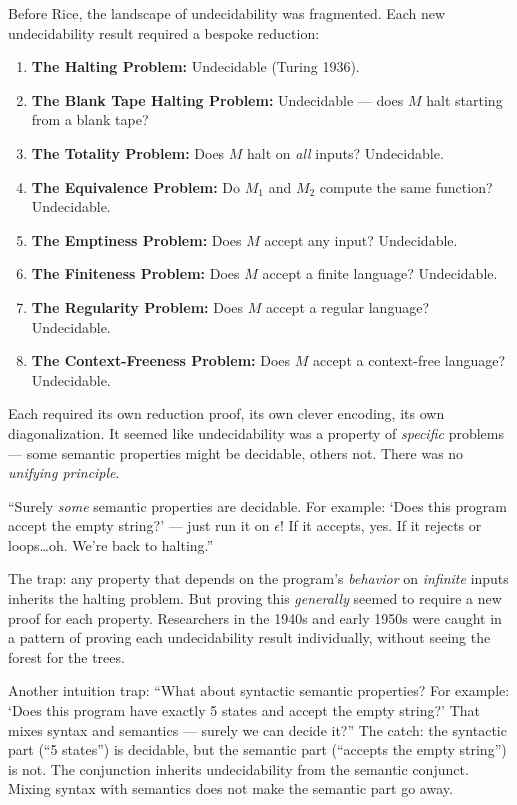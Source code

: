 Before Rice, the landscape of undecidability was fragmented. Each new undecidability result required a bespoke reduction:

\begin{enumerate}
\item \textbf{The Halting Problem:} Undecidable (Turing 1936).
\item \textbf{The Blank Tape Halting Problem:} Undecidable --- does $M$ halt starting from a blank tape?
\item \textbf{The Totality Problem:} Does $M$ halt on \emph{all} inputs? Undecidable.
\item \textbf{The Equivalence Problem:} Do $M_1$ and $M_2$ compute the same function? Undecidable.
\item \textbf{The Emptiness Problem:} Does $M$ accept any input? Undecidable.
\item \textbf{The Finiteness Problem:} Does $M$ accept a finite language? Undecidable.
\item \textbf{The Regularity Problem:} Does $M$ accept a regular language? Undecidable.
\item \textbf{The Context-Freeness Problem:} Does $M$ accept a context-free language? Undecidable.
\end{enumerate}

Each required its own reduction proof, its own clever encoding, its own diagonalization. It seemed like undecidability was a property of \emph{specific} problems --- some semantic properties might be decidable, others not. There was no \emph{unifying principle}.

``Surely \emph{some} semantic properties are decidable. For example: `Does this program accept the empty string?' --- just run it on $\epsilon$! If it accepts, yes. If it rejects or loops\ldots oh. We're back to halting.''

The trap: any property that depends on the program's \emph{behavior} on \emph{infinite} inputs inherits the halting problem. But proving this \emph{generally} seemed to require a new proof for each property. Researchers in the 1940s and early 1950s were caught in a pattern of proving each undecidability result individually, without seeing the forest for the trees.

Another intuition trap: ``What about syntactic semantic properties? For example: `Does this program have exactly 5 states and accept the empty string?' That mixes syntax and semantics --- surely we can decide it?'' The catch: the syntactic part (``5 states'') is decidable, but the semantic part (``accepts the empty string'') is not. The conjunction inherits undecidability from the semantic conjunct. Mixing syntax with semantics does not make the semantic part go away.

